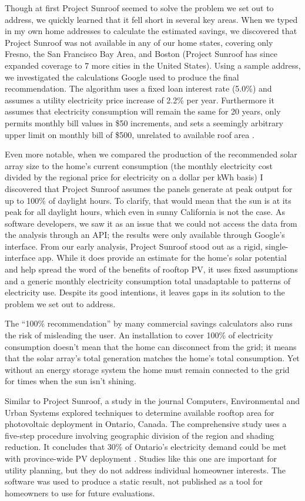 \documentclass[pageno]{jpaper}
\begin{document}
Though at first Project Sunroof seemed to solve the problem we set out to address, we quickly learned that it fell short in several key areas. When we typed in my own home addresses to calculate the estimated savings, we discovered that Project Sunroof was not available in any of our home states, covering only Fresno, the San Francisco Bay Area, and Boston (Project Sunroof has since expanded coverage to 7 more cities in the United States). Using a sample address, we investigated the calculations Google used to produce the final recommendation. The algorithm uses a fixed loan interest rate (5.0\%) and assumes a utility electricity price increase of 2.2\% per year. Furthermore it assumes that electricity consumption will remain the same for 20 years, only permits monthly bill values in \$50 increments, and sets a seemingly arbitrary upper limit on monthly bill of \$500, unrelated to available roof area \cite{Sunroof}. 

Even more notable, when we compared the production of the recommended solar array size to the home's current consumption (the monthly electricity cost divided by the regional price for electricity on a dollar per kWh basis) I discovered that Project Sunroof assumes the panels generate at peak output for up to 100\% of daylight hours. To clarify, that would mean that the sun is at its peak for all daylight hours, which even in sunny California is not the case. As software developers, we saw it as an issue that we could not access the data from the analysis through an API; the results were only available through Google's interface. From our early analysis, Project Sunroof stood out as a rigid, single-interface app. While it does provide an estimate for the home's solar potential and help spread the word of the benefits of rooftop PV, it uses fixed assumptions and a generic monthly electricity consumption total unadaptable to patterns of electricity use. Despite its good intentions, it leaves gaps in its solution to the problem we set out to address.

\indent The ``100\% recommendation'' by many commercial savings calculators also runs the risk of misleading the user. An installation to cover 100\% of electricity consumption doesn't mean that the home can disconnect from the grid; it means that the solar array's total generation matches the home's total consumption. Yet without an energy storage system the home must remain connected to the grid for times when the sun isn't shining.

Similar to Project Sunroof, a study in the journal Computers, Environmental and Urban Systems explored techniques to determine available rooftop area for photovoltaic deployment in Ontario, Canada. The comprehensive study uses a five-step procedure involving geographic division of the region and shading reduction. It concludes that 30\% of Ontario's electricity demand could be met with province-wide PV deployment \cite{Wiginton2010345}. Studies like this one are important for utility planning, but they do not address individual homeowner interests. The software was used to produce a static result, not published as a tool for homeowners to use for future evaluations.
\end{document}
